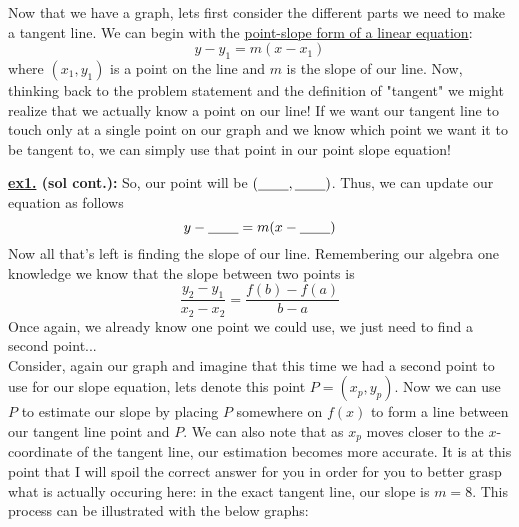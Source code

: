 \documentclass[addpoints]{exam}
\begin{document}
\begin{questions}
\begin{minipage}{0.45\linewidth}
      \end{minipage}
      \hfill 
      \begin{minipage}{0.45\linewidth}
        Now that we have a graph, lets first consider the different parts we need to make a tangent line. We can begin with the \underline{point-slope form of a linear equation}:
        \[y-y_1 = m(x-x_1)\]
        where $(x_1, y_1)$ is a point on the line and $m$ is the slope of our line. Now, thinking back to the problem statement and the definition of "tangent" we might realize that we actually know a point on our line! If we want our tangent line to touch only at a single point on our graph and we know which point we want it to be tangent to, we can simply use that point in our point slope equation!
      \end{minipage}
      \newpage 
      \large\textbf{\underline{ex1.} (sol cont.):} \normalsize So, our point will be $(\underline{\hspace{0.3in}}, \underline{\hspace{0.3in}})$. Thus, we can update our equation as follows
      \[
        y-\underline{\hspace{0.3in}} = m(x-\underline{\hspace{0.3in}})
      \]
      Now all that's left is finding the slope of our line. Remembering our algebra one knowledge we know that the slope between two points is 
      \[
        \frac{y_2-y_1}{x_2-x_2} = \frac{f(b)-f(a)}{b-a}
      \]
      Once again, we already know one point we could use, we just need to find a second point...\\ 
      Consider, again our graph and imagine that this time we had a second point to use for our slope equation, lets denote this point $P = (x_p, y_p)$. Now we can use $P$ to estimate our slope by placing $P$ somewhere on $f(x)$ to form a line between our tangent line point and $P$. We can also note that as $x_p$ moves closer to the $x$-coordinate of the tangent line, our estimation becomes more accurate. It is at this point that I will spoil the correct answer for you in order for you to better grasp what is actually occuring here: in the exact tangent line, our slope is $m=8$. This process can be illustrated with the below graphs: 
      \vspace{0.1in}
      \newline
      \begin{minipage}{0.31\linewidth}

\end{minipage}
\end{questions}
\end{document}
